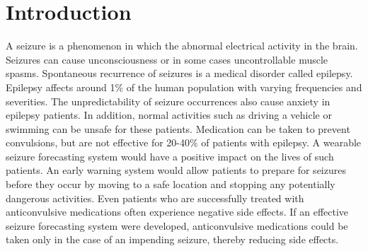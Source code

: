 \documentclass[10pt, conference, compsocconf]{IEEEtran}
\begin{document}




\maketitle





%
\IEEEpeerreviewmaketitle





\section{Introduction} 
A seizure is a phenomenon in which the abnormal electrical activity in the
brain. Seizures can cause unconsciousness or in some cases uncontrollable muscle
spasms. Spontaneous recurrence of seizures is a medical disorder called
epilepsy. Epilepsy affects around 1\% of the human population with varying
frequencies and severities. The unpredictability of seizure occurrences also
cause anxiety in epilepsy patients. In addition, normal activities such as
driving a vehicle or swimming can be unsafe for these patients. Medication can
be taken to prevent convulsions, but are not effective for 20-40\% of patients
with epilepsy. A wearable seizure forecasting system would have a positive
impact on the lives of such patients. An early warning system would allow
patients to prepare for seizures before they occur by moving to a safe location
and stopping any potentially dangerous activities. Even patients who are
successfully treated with anticonvulsive medications often experience negative
side effects. If an effective seizure forecasting system were developed,
anticonvulsive medications could be taken only in the case of an impending
seizure, thereby reducing side effects.
\end{document}
